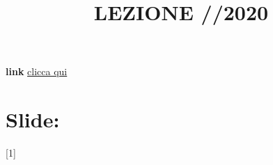 \title{LEZIONE //2020}\newline
\textbf{link} \href{}{clicca qui}
\section*{Slide: }
[1]
\newline[2]
\newline[3]
\newline[4]
\newline[5]
\newline[6]
\newline[7]
\newline[8]
\newline[9]
\newline[10]
\newline[11]
\newline[12]
\newline[13]
\newline[14]
\newline[15]
\newline[16]
\newline[17]
\newline[18]
\newline[19]
\newline[20]
\newline[21]
\newline[22]
\newline[23]
\newline[24]
\newline[25]
\newline[26]
\newline[27]
\newline[28]
\newline[29]
\newline[30]
\newline[31]
\newline[32]
\newline[33]